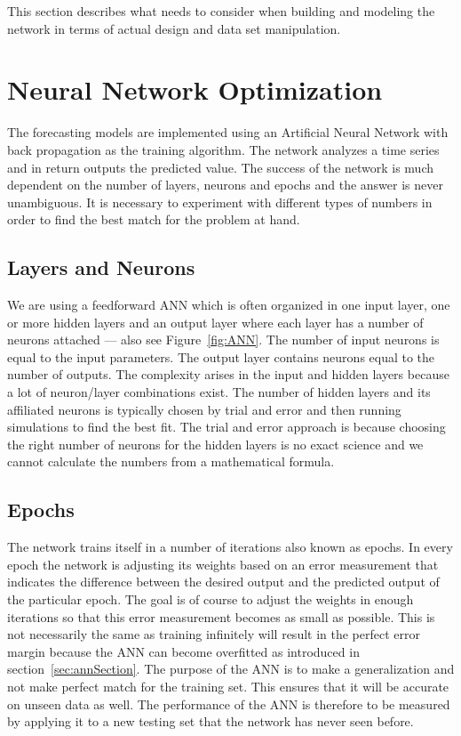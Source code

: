 This section describes what needs to consider when building and modeling the network in terms of actual design and data set manipulation.

\section{Neural Network Optimization}
\label{sec:neuralNetworkOptimization}
The forecasting models are implemented using an Artificial Neural Network with back propagation as the training algorithm. The network analyzes a time series and in return outputs the predicted value. The success of the network is much dependent on the number of layers, neurons and epochs and the answer is never unambiguous. It is necessary to experiment with different types of numbers in order to find the best match for the problem at hand.

\subsection{Layers and Neurons}
\label{sec:layersAndNeurons}
We are using a feedforward ANN which is often organized in one input layer, one or more hidden layers and an output layer where each layer has a number of neurons attached\cite{1} --- also see Figure~\ref{fig:ANN}. The number of input neurons is equal to the input parameters. The output layer contains neurons equal to the number of outputs. 
The complexity arises in the input and hidden layers because a lot of neuron/layer combinations exist. The number of hidden layers and its affiliated neurons is typically chosen by trial and error and then running simulations to find the best fit\cite{1}. The trial and error approach is because choosing the right number of neurons for the hidden layers is no exact science and we cannot calculate the numbers from a mathematical formula.

\subsection{Epochs}
\label{sec:epochs}
The network trains itself in a number of iterations also known as epochs. In every epoch the network is adjusting its weights based on an error measurement that indicates the difference between the desired output and the predicted output of the particular epoch\cite{1}. The goal is of course to adjust the weights in enough iterations so that this error measurement becomes as small as possible. This is not necessarily the same as training infinitely will result in the perfect error margin because the ANN can become overfitted as introduced in section~\ref{sec:annSection}. The purpose of the ANN is to make a generalization and not make perfect match for the training set. This ensures that it will be accurate on unseen data\cite{1} as well. The performance of the ANN is therefore to be measured by applying it to a new testing set that the network has never seen before.

